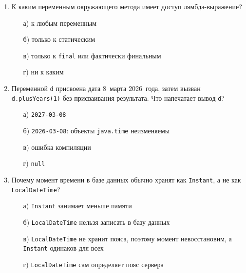 \begin{enumerate}
\item К каким переменным окружающего метода имеет доступ лямбда-выражение?
  \begin{enumerate}
    \item[а)] к любым переменным
    \item[б)] только к статическим
    \item[в)] только к \texttt{final} или фактически финальным
    \item[г)] ни к каким
  \end{enumerate}

\item Переменной \texttt{d} присвоена дата 8~марта 2026~года, затем вызван
      \texttt{d.plusYears(1)} без присваивания результата. Что напечатает
      вывод \texttt{d}?
  \begin{enumerate}
    \item[а)] \texttt{2027-03-08}
    \item[б)] \texttt{2026-03-08}: объекты \texttt{java.time} неизменяемы
    \item[в)] ошибка компиляции
    \item[г)] \texttt{null}
  \end{enumerate}

\item Почему момент времени в базе данных обычно хранят как \texttt{Instant},
      а не как \texttt{LocalDateTime}?
  \begin{enumerate}
    \item[а)] \texttt{Instant} занимает меньше памяти
    \item[б)] \texttt{LocalDateTime} нельзя записать в базу данных
    \item[в)] \texttt{LocalDateTime} не хранит пояса, поэтому момент
              невосстановим, а \texttt{Instant} одинаков для всех
    \item[г)] \texttt{LocalDateTime} сам определяет пояс сервера
  \end{enumerate}

\end{enumerate}
